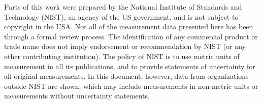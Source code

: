 \documentclass{book}
\begin{document}
Parts of this work were prepared by the National Institute of Standards and Technology (NIST), an agency of the US government, and is not subject to copyright in the USA. Not all of the measurement data presented here has been through a formal review process. The identification of any commercial product or trade name does not imply endorsement or recommendation by NIST (or any other contributing institution). The policy of NIST is to use metric units of measurement in all its publications, and to provide statements of uncertainty for all original measurements. In this document, however, data from organizations outside NIST are shown, which may include measurements in non-metric units or measurements without uncertainty statements.

 

\newpage

\tableofcontents

\mainmatter

\pagestyle{fancy}
\end{document}
